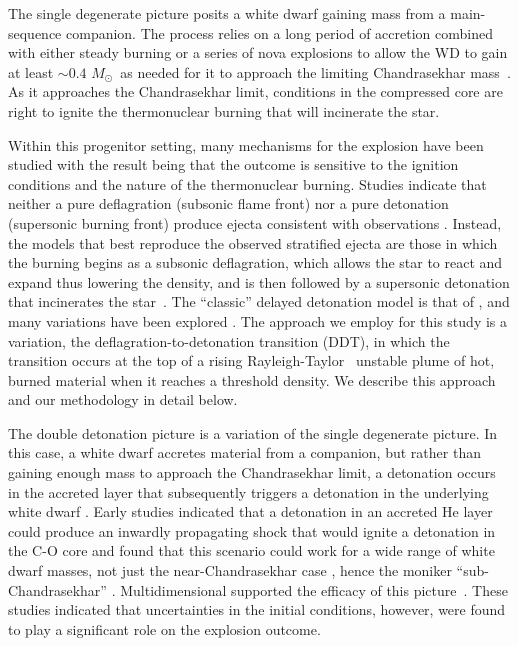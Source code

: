 \documentclass[iop,apj]{emulateapj}
\newcommand{\Msun}{\ensuremath{M_\odot}}
\begin{document}
The single degenerate picture posits a white dwarf gaining mass
from a main-sequence companion. The process relies on a long
period of accretion combined with either steady burning or a 
series of nova explosions to allow the WD to gain at least
$\sim 0.4$ \Msun\ as needed for it to approach the
limiting Chandrasekhar mass~\citep{starrfieldetal2012}. As it approaches
the Chandrasekhar limit, conditions in the compressed core are right
to ignite the thermonuclear burning that will incinerate the star. 

Within this progenitor setting, many mechanisms for the explosion have 
been studied with the result being that the outcome is sensitive to
the ignition conditions and the nature of the thermonuclear burning.
Studies indicate that neither a pure deflagration (subsonic flame front)
nor a pure detonation (supersonic burning front) produce ejecta consistent
with observations \citep{arnett69,roepkeetal07}.  Instead, the models 
that best reproduce the observed stratified ejecta are those in which 
the burning begins as a subsonic deflagration, which allows the star 
to react and expand thus lowering the density, and is then followed by a 
supersonic detonation that incinerates the 
star~\citep{Nomo84,Khokhlov1991Delayed-detonat,HoefKhok96,GameKhokOran05}.
The ``classic'' delayed detonation model is that of 
\citet{Khokhlov1991Delayed-detonat} \citep[See also][]{hoflich.khokhlov.ea:delayed,GameKhokOran05},
and many variations have been 
explored \citep[and references therein]{hillebrandtetal2013,calderetal2013}.
The approach we employ for this study is a variation, the 
deflagration-to-detonation transition (DDT), in which the transition
occurs at the top of a rising Rayleigh-Taylor~\citep{taylor+50,chandra+81} 
unstable plume of hot, burned 
material when it reaches a threshold density.
We describe this approach and our methodology in detail below.

The double detonation picture is a variation of the single degenerate picture.
In this case, a white dwarf accretes material from a companion, but rather
than gaining enough mass to approach the Chandrasekhar limit, a detonation
occurs in the accreted layer that subsequently triggers a detonation
in the underlying white dwarf \citet{woosleyweavertaam80,taam80a,taam80b,
nomoto80,nomoto82b}. Early studies indicated that a detonation in an 
accreted He
layer could produce an inwardly propagating
shock that would ignite a detonation in the C-O core and found
that this scenario could work for a wide range of white dwarf
masses, not just the near-Chandrasekhar case \citep{livne90}, hence the
moniker ``sub-Chandrasekhar'' \citep{ww94}. Multidimensional supported the
efficacy of this picture~\citep{livneglasner91, livnearnett95,HoefKhok96,
hoeflichetal96, wigginsfalle97,wigginsetal98,garciasenzbravowoosley99}. 
These studies indicated that uncertainties in the initial conditions, 
however, were found to play a significant role on the explosion outcome. 
\end{document}
